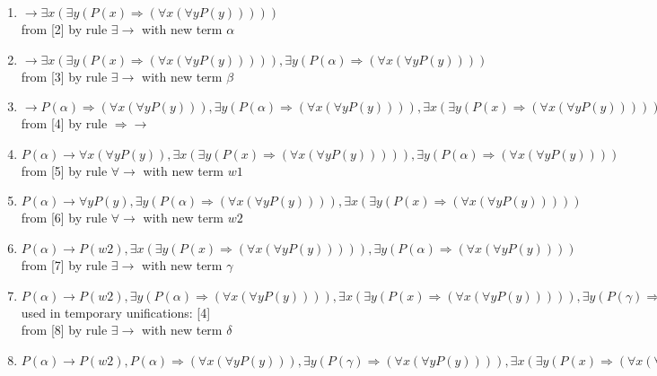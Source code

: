 %

\begin{enumerate}
\item $ \rightarrow   \exists  x ( \exists  y (P(x)  \Rightarrow  ( \forall  x ( \forall  y P(y)))))$\\
 from [2] by rule $\exists \rightarrow $ with new term $\alpha$
\item $ \rightarrow   \exists  x ( \exists  y (P(x)  \Rightarrow  ( \forall  x ( \forall  y P(y))))),  \exists  y (P(\alpha)  \Rightarrow  ( \forall  x ( \forall  y P(y))))$\\
 from [3] by rule $\exists \rightarrow $ with new term $\beta$
\item $ \rightarrow  P(\alpha)  \Rightarrow  ( \forall  x ( \forall  y P(y))),  \exists  y (P(\alpha)  \Rightarrow  ( \forall  x ( \forall  y P(y)))),  \exists  x ( \exists  y (P(x)  \Rightarrow  ( \forall  x ( \forall  y P(y)))))$\\
 from [4] by rule $ \Rightarrow \rightarrow $
\item $P(\alpha) \rightarrow   \forall  x ( \forall  y P(y)),  \exists  x ( \exists  y (P(x)  \Rightarrow  ( \forall  x ( \forall  y P(y))))),  \exists  y (P(\alpha)  \Rightarrow  ( \forall  x ( \forall  y P(y))))$\\
 from [5] by rule $\forall \rightarrow $ with new term $w1$
\item $P(\alpha) \rightarrow   \forall  y P(y),  \exists  y (P(\alpha)  \Rightarrow  ( \forall  x ( \forall  y P(y)))),  \exists  x ( \exists  y (P(x)  \Rightarrow  ( \forall  x ( \forall  y P(y)))))$\\
 from [6] by rule $\forall \rightarrow $ with new term $w2$
\item $P(\alpha) \rightarrow  P(w2),  \exists  x ( \exists  y (P(x)  \Rightarrow  ( \forall  x ( \forall  y P(y))))),  \exists  y (P(\alpha)  \Rightarrow  ( \forall  x ( \forall  y P(y))))$\\
 from [7] by rule $\exists \rightarrow $ with new term $\gamma$
\item $P(\alpha) \rightarrow  P(w2),  \exists  y (P(\alpha)  \Rightarrow  ( \forall  x ( \forall  y P(y)))),  \exists  x ( \exists  y (P(x)  \Rightarrow  ( \forall  x ( \forall  y P(y))))),  \exists  y (P(\gamma)  \Rightarrow  ( \forall  x ( \forall  y P(y))))$\\
  used in temporary unifications: [4]\\
 from [8] by rule $\exists \rightarrow $ with new term $\delta$
\item $P(\alpha) \rightarrow  P(w2), P(\alpha)  \Rightarrow  ( \forall  x ( \forall  y P(y))),  \exists  y (P(\gamma)  \Rightarrow  ( \forall  x ( \forall  y P(y)))),  \exists  x ( \exists  y (P(x)  \Rightarrow  ( \forall  x ( \forall  y P(y))))),  \exists  y (P(\alpha)  \Rightarrow  ( \forall  x ( \forall  y P(y))))$\\

\end{enumerate}
